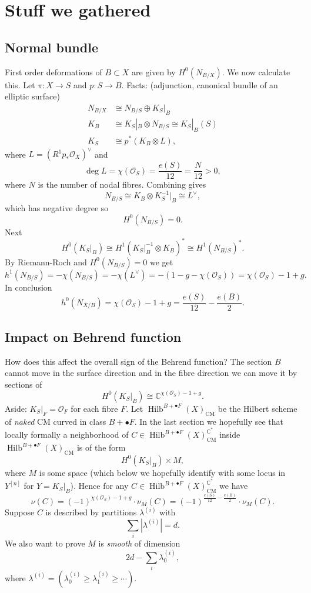 \documentclass{amsart}
\theoremstyle{definition}
\newcommand{\CC} {\mathbb{C}}          %
\renewcommand{\O}{\mathcal{O}}
\newcommand{\Hilb}{\operatorname{Hilb}}
\newcommand{\CM}{\operatorname{CM}}
\begin{document}
\section{Stuff we gathered}

\subsection{Normal bundle} First order deformations of $B \subset X$ are given by $H^0(N_{B/X})$. We now calculate this. Let $\pi : X \rightarrow S$ and $p : S \rightarrow B$. Facts: (adjunction, canonical bundle of an elliptic surface)
\begin{align*}
N_{B/X} &\cong N_{B/S} \oplus K_{S}|_{B} \\
K_{B} &\cong K_{S}|_{B} \otimes N_{B/S} \cong K_{S}|_{B}(S) \\
K_S &\cong p^*(K_B \otimes L),
\end{align*}
where $L = (R^1 p_* \O_X)^{\vee}$ and 
\[
\deg L = \chi(\O_S) = \frac{e(S)}{12} = \frac{N}{12} > 0,
\]
where $N$ is the number of nodal fibres. Combining gives
\[
N_{B/S} \cong K_{B} \otimes K_{S}^{-1}|_{B} \cong L^\vee,
\] 
which has negative degree so 
\[
H^0(N_{B/S}) = 0.
\]     
Next
\[
H^0(K_S|_B) \cong H^1(K_S|_{B}^{-1} \otimes K_B)^* \cong H^1(N_{B/S})^*.
\]     
By Riemann-Roch and $H^0(N_{B/S}) = 0$ we get
\[
h^1(N_{B/S}) = -\chi(N_{B/S}) = - \chi(L^\vee)= -(1-g - \chi(\O_S)) = \chi(\O_S) - 1+g.
\]     
In conclusion
\[
h^0(N_{X/B}) = \chi(\O_S) - 1+g = \frac{e(S)}{12} - \frac{e(B)}{2}.
\]     


\subsection{Impact on Behrend function} How does this affect the overall sign of the Behrend function? The section $B$ cannot move in the surface direction and in the fibre direction we can move it by sections of 
\[
H^0(K_S|_B) \cong \CC^{\chi(\O_S) - 1+g}.
\]     
Aside: $K_{S}|_{F} = \O_F$ for each fibre $F$. Let $\Hilb^{B+\bullet F}(X)_{\CM}$ be the Hilbert scheme of \emph{naked} CM curved in class $B+\bullet F$. In the last section we hopefully see that locally formally a neighborhood of $C \in \Hilb^{B+\bullet F}(X)^{\CC^*}_{\CM}$ inside $\Hilb^{B+\bullet F}(X)_{\CM}$ is of the form
\[
H^0(K_S|_B) \times M,
\]
where $M$ is some space (which below we hopefully identify with some locus in $Y^{[n]}$ for $Y = K_{S}|_{B}$). Hence for any $C \in \Hilb^{B+\bullet F}(X)^{\CC^*}_{\CM}$ we have
$$
\nu(C) = (-1)^{\chi(\O_S) - 1+g} \cdot \nu_{M}(C) = (-1)^{\frac{e(S)}{12} - \frac{e(B)}{2}} \cdot \nu_{M}(C).
$$
Suppose $C$ is described by partitions $\lambda^{(i)}$ with
\[
\sum_i |\lambda^{(i)}| = d.
\]
We also want to prove $M$ is \emph{smooth} of dimension
$$
2d - \sum_i \lambda_{0}^{(i)},
$$
where $\lambda^{(i)} = (\lambda^{(i)}_{0} \geq \lambda^{(i)}_{1} \geq \cdots)$.
\end{document}
